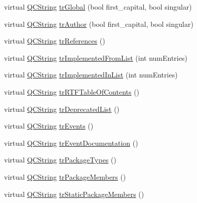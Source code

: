 \begin{DoxyCompactItemize}
\item 
virtual \mbox{\hyperlink{class_q_c_string}{Q\+C\+String}} \mbox{\hyperlink{class_translator_vietnamese_a4ca8551757adc2434f88cd759228deeb}{tr\+Global}} (bool first\+\_\+capital, bool singular)
\item 
virtual \mbox{\hyperlink{class_q_c_string}{Q\+C\+String}} \mbox{\hyperlink{class_translator_vietnamese_a000e934d9b609913d306d66ee6a89359}{tr\+Author}} (bool first\+\_\+capital, bool singular)
\item 
virtual \mbox{\hyperlink{class_q_c_string}{Q\+C\+String}} \mbox{\hyperlink{class_translator_vietnamese_a7ee37291a0f2666c144d4654013c46bc}{tr\+References}} ()
\item 
virtual \mbox{\hyperlink{class_q_c_string}{Q\+C\+String}} \mbox{\hyperlink{class_translator_vietnamese_a7fef0dc52c8cdc4a3ee6bb89304b1c78}{tr\+Implemented\+From\+List}} (int num\+Entries)
\item 
virtual \mbox{\hyperlink{class_q_c_string}{Q\+C\+String}} \mbox{\hyperlink{class_translator_vietnamese_a67ec542d90ee97bbe254ae4edbf7395b}{tr\+Implemented\+In\+List}} (int num\+Entries)
\item 
virtual \mbox{\hyperlink{class_q_c_string}{Q\+C\+String}} \mbox{\hyperlink{class_translator_vietnamese_ac98c62af9a20f4b585c395291ee77119}{tr\+R\+T\+F\+Table\+Of\+Contents}} ()
\item 
virtual \mbox{\hyperlink{class_q_c_string}{Q\+C\+String}} \mbox{\hyperlink{class_translator_vietnamese_abeaca8aa5e62d5f3dc46deabc410f7f3}{tr\+Deprecated\+List}} ()
\item 
virtual \mbox{\hyperlink{class_q_c_string}{Q\+C\+String}} \mbox{\hyperlink{class_translator_vietnamese_a805e3ba6215964887711cd28c53325ea}{tr\+Events}} ()
\item 
virtual \mbox{\hyperlink{class_q_c_string}{Q\+C\+String}} \mbox{\hyperlink{class_translator_vietnamese_ad0aa62f0b15578fa9e494ff273166438}{tr\+Event\+Documentation}} ()
\item 
virtual \mbox{\hyperlink{class_q_c_string}{Q\+C\+String}} \mbox{\hyperlink{class_translator_vietnamese_ab05f0d5c4c8aded66988273c6d1e322a}{tr\+Package\+Types}} ()
\item 
virtual \mbox{\hyperlink{class_q_c_string}{Q\+C\+String}} \mbox{\hyperlink{class_translator_vietnamese_afafa8df38661a460d19ae97509725ca0}{tr\+Package\+Members}} ()
\item 
virtual \mbox{\hyperlink{class_q_c_string}{Q\+C\+String}} \mbox{\hyperlink{class_translator_vietnamese_a71ca49d89fe741faf2e568cb9aaa474d}{tr\+Static\+Package\+Members}} ()

\end{DoxyCompactItemize}
